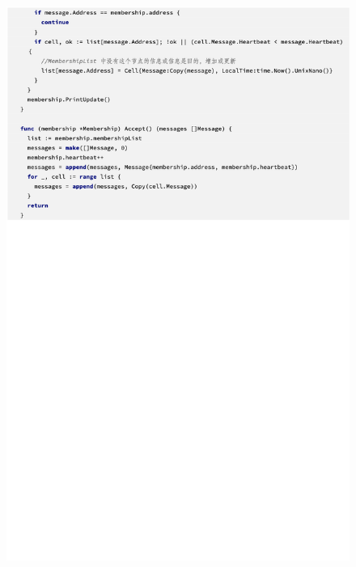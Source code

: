  \begin{figure}[!htbp]
    \small
    \centering
    \includegraphics[width=14cm]{../figures/code/5.png}
 \end{figure}